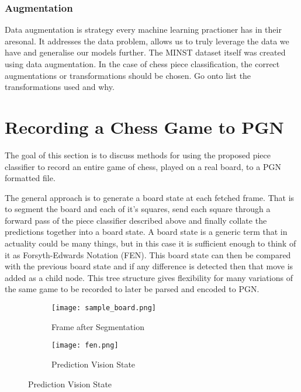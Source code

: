 \subsubsection{Augmentation}
Data augmentation is strategy every machine learning practioner has in their aresonal.  It addresses the data problem, allows us to truly 
leverage the data we have and generalise our models further.  The MINST \cite{} dataset itself was created using data augmentation.
In the case of chess piece classification, the correct augmentations or transformations should be chosen.
Go onto list the transformations used and why.


\section{Recording a Chess Game to PGN}
The goal of this section is to discuss methods for using the proposed piece classifier to record an entire game of chess, played on a real board, 
to a PGN formatted file.

The general approach is to generate a board state at each fetched frame.  That is to segment the board and each of it's squares, send each square 
through a forward pass of the piece classifier described above and finally collate the predictions together into a board state.  A board state is 
a generic term that in actuality could be many things, but in this case it is sufficient enough to think of it as Forsyth-Edwards Notation (FEN).
This board state can then be compared with the previous board state and if any difference is detected then that move is added as a child node.
This tree structure gives flexibility for many variations of the same game to be recorded to later be parsed and encoded to PGN.


\begin{figure}[h]
    \centering
    \begin{subfigure}[b]{0.48\textwidth}
        \centering
        \texttt{[image: sample\_board.png]}
        \caption{Frame after Segmentation}
    \end{subfigure}
    \hfill
    \begin{subfigure}[b]{0.48\textwidth}
        \centering
        \texttt{[image: fen.png]}
        \caption{Prediction Vision State}
    \end{subfigure}
\label{fig:visionstate}
\end{figure}

